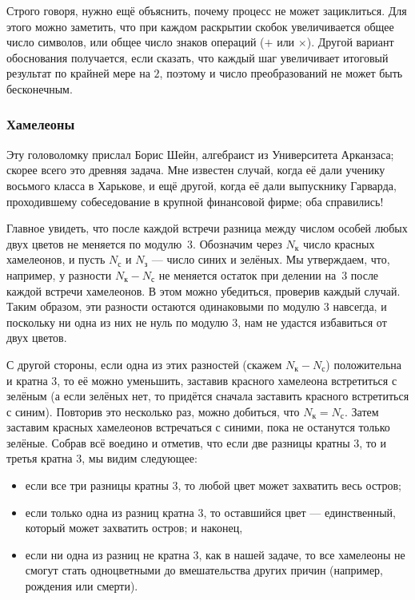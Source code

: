 \begin{addedbytheeditors}
Строго говоря, нужно ещё объяснить, почему процесс не может зациклиться. Для этого можно заметить, что при каждом раскрытии скобок увеличивается общее число символов, или общее число знаков операций ($+$ или $\times$). Другой вариант обоснования получается, если сказать, что каждый шаг увеличивает итоговый результат по крайней мере на $2$, поэтому и число преобразований не может быть бесконечным.\pr
\end{addedbytheeditors}

\subsubsection*{Хамелеоны}

Эту головоломку прислал Борис Шейн, алгебраист из Университета Арканзаса; скорее всего это древняя задача.
Мне известен случай, когда её дали ученику восьмого класса в Харькове,
и ещё другой, когда её дали выпускнику Гарварда, проходившему собеседование в крупной финансовой фирме; оба справились!

Главное увидеть, что после каждой встречи разница между числом особей любых двух цветов не меняется по модулю~3.
Обозначим через $N_{\text{к}}$ число красных хамелеонов, и пусть
$N_{\text{с}}$ и $N_{\text{з}}$ --- число синих и зелёных.
Мы утверждаем, что, например, у разности $N_{\text{к}} - N_{\text{с}}$ не меняется остаток при делении на~$3$ после каждой встречи хамелеонов.
В этом можно убедиться, проверив каждый случай.
Таким образом, эти разности остаются одинаковыми по модулю 3 навсегда, и поскольку ни одна из них не нуль по модулю 3, нам не удастся избавиться от двух цветов.

С другой стороны, если одна из этих разностей (скажем $N_{\text{к}} - N_{\text{с}}$) положительна и кратна $3$, то её можно уменьшить, заставив красного хамелеона встретиться с зелёным (а если зелёных нет, то придётся сначала заставить красного встретиться с синим).
Повторив это несколько раз, можно добиться, что $N_{\text{к}} = N_{\text{с}}$.
Затем заставим красных хамелеонов встречаться с синими, пока не останутся только зелёные.
Собрав всё воедино и отметив, что если две разницы кратны $3$, то и третья кратна $3$, мы видим следующее:
\begin{itemize}
\item если все три разницы кратны 3, то любой цвет может захватить весь остров;
\item если только одна из разниц кратна 3, то оставшийся цвет --- единственный, который может захватить остров; и наконец,
\item если ни одна из разниц не кратна 3, как в нашей задаче, то все хамелеоны не смогут стать одноцветными до вмешательства других причин (например, рождения или смерти).
\end{itemize}

